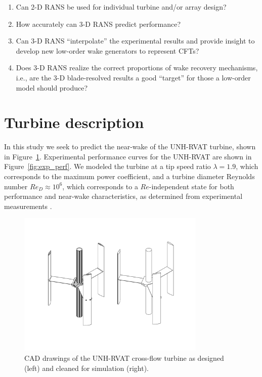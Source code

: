 \documentclass[aip,graphicx]{revtex4-1}
\begin{document}
\begin{enumerate}
    \item Can 2-D RANS be used for individual turbine and/or array design?
    
    \item How accurately can 3-D RANS predict performance?
    
    \item Can 3-D RANS ``interpolate'' the experimental results and provide
    insight to develop new low-order wake generators to represent CFTs?
    
    \item Does 3-D RANS realize the correct proportions of wake recovery
    mechanisms, i.e., are the 3-D blade-resolved results a good ``target'' for
    those a low-order model should produce?
\end{enumerate}


\section{Turbine description}

In this study we seek to predict the near-wake of the UNH-RVAT turbine, shown in
Figure~\ref{fig:RVAT-CAD}. Experimental performance curves for the UNH-RVAT are
shown in Figure~\ref{fig:exp_perf}. We modeled the turbine at a tip speed ratio
$\lambda=1.9$, which corresponds to the maximum power coefficient, and a turbine
diameter Reynolds number $Re_D \approx 10^6$, which corresponds to a
$Re$-independent state for both performance and near-wake characteristics, as
determined from experimental measurements \cite{Bachant2014,
    Bachant2015-RVAT-Re-dep}.


\begin{figure}[ht]
    \centering
    
    \includegraphics[clip, trim=0 1in 0 1in, width=0.8\textwidth]{figures/CAD}
    
    \caption{CAD drawings of the UNH-RVAT cross-flow turbine as designed (left)
        and cleaned for simulation (right).}
    
    \label{fig:RVAT-CAD}
\end{figure}
\end{document}

